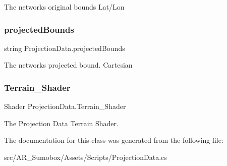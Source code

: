 The networks original bounds Lat/\+Lon 

\mbox{\label{class_projection_data_aa8e9a11cb798f79b76f73d508d5c4f99}} 
\subsubsection{\texorpdfstring{projectedBounds}{projectedBounds}}
{\footnotesize\ttfamily string Projection\+Data.\+projected\+Bounds}



The networks projected bound. Cartesian 

\mbox{\label{class_projection_data_ab853560889dd0c25033de418ab53b478}} 
\subsubsection{\texorpdfstring{Terrain\_Shader}{Terrain\_Shader}}
{\footnotesize\ttfamily Shader Projection\+Data.\+Terrain\+\_\+\+Shader}



The Projection Data Terrain Shader. 



The documentation for this class was generated from the following file\+:\begin{DoxyCompactItemize}
\item 
src/\+A\+R\+\_\+\+Sumobox/\+Assets/\+Scripts/Projection\+Data.\+cs\end{DoxyCompactItemize}
